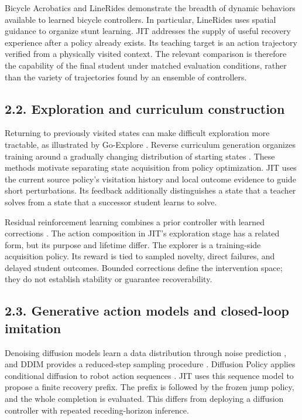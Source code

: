 \documentclass[
  american,
  11pt,
  a4paper,
]{article}
\begin{document}
Bicycle Acrobatics \cite{fahmi2026bicycle} and LineRides \cite{rho2026linerides} demonstrate the breadth
of dynamic behaviors available to learned bicycle controllers. In
particular, LineRides uses spatial guidance to organize stunt learning.
JIT addresses the supply of useful recovery experience after a policy
already exists. Its teaching target is an action trajectory verified
from a physically visited context. The relevant comparison is therefore
the capability of the final student under matched evaluation conditions,
rather than the variety of trajectories found by an ensemble of
controllers.

\subsection{2.2. Exploration and curriculum
construction}\label{exploration-and-curriculum-construction}

Returning to previously visited states can make difficult exploration
more tractable, as illustrated by Go-Explore \cite{ecoffet2021goexplore}. Reverse curriculum
generation organizes training around a gradually changing distribution
of starting states \cite{florensa2017reverse}. These methods motivate separating state
acquisition from policy optimization. JIT uses the current source
policy's visitation history and local outcome evidence to guide short
perturbations. Its feedback additionally distinguishes a state that a
teacher solves from a state that a successor student learns to solve.

Residual reinforcement learning combines a prior controller with learned
corrections \cite{johannink2019residual}. The action composition in JIT's exploration stage
has a related form, but its purpose and lifetime differ. The explorer is
a training-side acquisition policy. Its reward is tied to sampled
novelty, direct failures, and delayed student outcomes. Bounded
corrections define the intervention space; they do not establish
stability or guarantee recoverability.

\subsection{2.3. Generative action models and closed-loop
imitation}\label{generative-action-models-and-closed-loop-imitation}

Denoising diffusion models learn a data distribution through noise
prediction \cite{ho2020ddpm}, and DDIM provides a reduced-step sampling procedure
\cite{song2021ddim}. Diffusion Policy applies conditional diffusion to robot action
sequences \cite{chi2023diffusionpolicy}. JIT uses this sequence model to propose a finite
recovery prefix. The prefix is followed by the frozen jump policy, and
the whole completion is evaluated. This differs from deploying a
diffusion controller with repeated receding-horizon inference.
\end{document}
